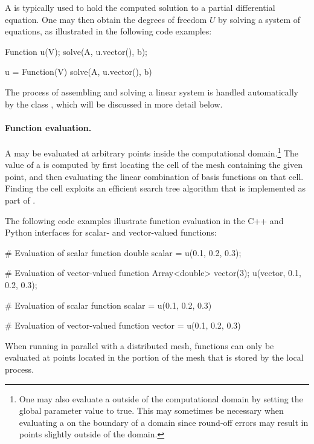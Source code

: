 A  is typically used to hold the computed solution to a
partial differential equation. One may then obtain the degrees of
freedom $U$ by solving a system of equations, as illustrated in the
following code examples:
\begin{c++}
Function u(V);
solve(A, u.vector(), b);
\end{c++}
\begin{c++}
u = Function(V)
solve(A, u.vector(), b)
\end{c++}
The process of assembling and solving a linear system is handled
automatically by the class , which will be
discussed in more detail below.

\paragraph{Function evaluation.}

A  may be evaluated at arbitrary points inside the
computational domain.\footnote{One may also evaluate a 
  outside of the computational domain by setting the global parameter value
   to true. This may sometimes be
  necessary when evaluating a  on the boundary of a
  domain since round-off errors may result in points slightly outside
  of the domain.} The value of a  is computed by first
locating the cell of the mesh containing the given point, and then
evaluating the linear combination of basis functions on that cell. Finding
the cell exploits an efficient search tree
algorithm that is implemented as part of \citet{www:cgal}.

The following code examples illustrate function evaluation in the C++
and Python interfaces for scalar- and vector-valued functions:
\begin{c++}
# Evaluation of scalar function
double scalar = u(0.1, 0.2, 0.3);

# Evaluation of vector-valued function
Array<double> vector(3);
u(vector, 0.1, 0.2, 0.3);
\end{c++}
\begin{python}
# Evaluation of scalar function
scalar = u(0.1, 0.2, 0.3)

# Evaluation of vector-valued function
vector = u(0.1, 0.2, 0.3)
\end{python}
When running in parallel with a distributed mesh, functions can only be
evaluated at points located in the portion of the mesh that is stored
by the local process.

